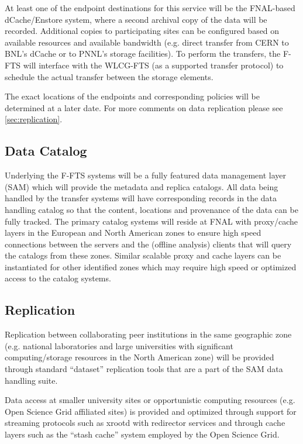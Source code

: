 \documentclass[pdftex,12pt,letter]{article}
\begin{document}

At least one of the endpoint destinations for this service will be the FNAL-based dCache/Enstore system, where a second archival
copy of the data will be recorded.  Additional copies to participating sites can be
configured based on available resources and available bandwidth (e.g. direct transfer from CERN to BNL’s dCache or to PNNL’s storage facilities). 
To perform the transfers, the F-FTS will interface with the WLCG-FTS (as a supported transfer protocol) to schedule the actual transfer
between the storage elements.  

The exact locations of the endpoints and corresponding policies will be determined at a later date. For more comments on data replication
please see \ref{sec:replication}.


\subsection{Data Catalog}
Underlying the F-FTS systems will be a fully featured data management layer (SAM) which will provide the metadata and replica catalogs.
All data being handled by the transfer systems will have corresponding records in the data handling catalog so that the content,
locations and provenance of the data can be fully tracked.  The primary catalog systems will reside at FNAL with proxy/cache
layers in the European and North American zones to ensure high speed connections between the servers and the (offline analysis)
clients that will query the catalogs from these zones.  Similar scalable proxy and cache layers can be instantiated for other identified
zones which may require high speed or optimized access to the catalog systems.
 
\subsection{Replication}
Replication between collaborating peer institutions in the same geographic zone  (e.g. national laboratories and large universities with significant
computing/storage resources in the North American zone) will be provided through standard ``dataset'' replication tools that are a part
of the SAM data handling suite.

Data access at smaller university sites or opportunistic computing resources (e.g. Open Science Grid
affiliated sites) is provided and optimized through support for streaming protocols such as xrootd with redirector
services and through cache layers such as the “stash cache” system employed by the Open Science Grid.  
\end{document}
